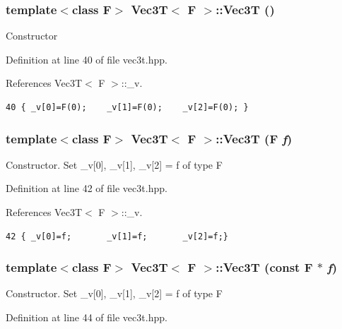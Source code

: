 \subsubsection{\setlength{\rightskip}{0pt plus 5cm}template$<$class F$>$ {\bf Vec3T}$<$ F $>$::{\bf Vec3T} ()\hspace{0.3cm}{\tt  [inline]}}\label{classVec3T_b886a93b10a2e9e48923a745ae509626_b886a93b10a2e9e48923a745ae509626}


Constructor 

Definition at line 40 of file vec3t.hpp.

References Vec3T$<$ F $>$::\_\-v.

\footnotesize\begin{verbatim}40 { _v[0]=F(0);    _v[1]=F(0);    _v[2]=F(0); }
\end{verbatim}\normalsize 


\subsubsection{\setlength{\rightskip}{0pt plus 5cm}template$<$class F$>$ {\bf Vec3T}$<$ F $>$::{\bf Vec3T} (F {\em f})\hspace{0.3cm}{\tt  [inline]}}\label{classVec3T_bad90f437fffa92ec0700a6123e153c6_bad90f437fffa92ec0700a6123e153c6}


Constructor. Set \_\-v[0], \_\-v[1], \_\-v[2] = f of type F 

Definition at line 42 of file vec3t.hpp.

References Vec3T$<$ F $>$::\_\-v.

\footnotesize\begin{verbatim}42 { _v[0]=f;       _v[1]=f;       _v[2]=f;}
\end{verbatim}\normalsize 


\subsubsection{\setlength{\rightskip}{0pt plus 5cm}template$<$class F$>$ {\bf Vec3T}$<$ F $>$::{\bf Vec3T} (const F $\ast$ {\em f})\hspace{0.3cm}{\tt  [inline]}}\label{classVec3T_eec3fa77dfea6354da6fca0957b84c47_eec3fa77dfea6354da6fca0957b84c47}


Constructor. Set \_\-v[0], \_\-v[1], \_\-v[2] = f of type F 

Definition at line 44 of file vec3t.hpp.

